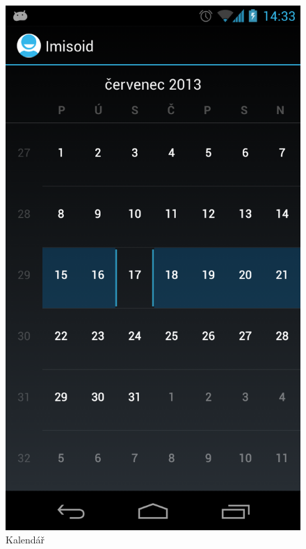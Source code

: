 \documentclass{diplomka}
\begin{document}
\begin{figure}[H]
\begin{minipage}{.45\textwidth}
 \includegraphics[width=.9\linewidth]{scr/calendar.png}
   \caption{Kalendář}
  \label{fig:calendar}
\end{minipage}
\end{figure}
\end{document}
